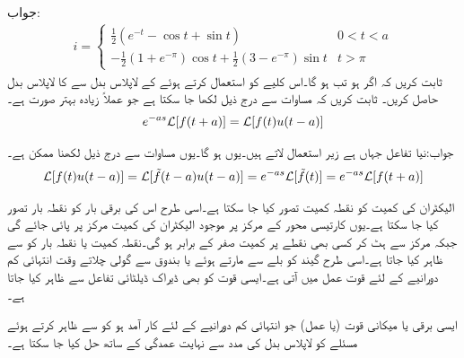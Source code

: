 جواب:
\begin{align*}
i=
\begin{cases}
\tfrac{1}{2}(e^{-t}-\cos t+\sin t) & 0<t<a\\
-\tfrac{1}{2}(1+e^{-\pi})\cos t+\tfrac{1}{2}(3-e^{-\pi})\sin t& t>\pi
\end{cases}
\end{align*}
ثابت کریں کہ اگر  ہو تب  ہو گا۔اس کلیے کو استعمال کرتے ہوئے  کے لاپلاس بدل سے  کا لاپلاس بدل حاصل کریں۔
ثابت کریں کہ مساوات  سے درج ذیل لکھا جا سکتا ہے جو عملاً زیادہ بہتر صورت ہے۔
\begin{align}
e^{-as}\mathcal{L}[f(t+a)]=\mathcal{L}[f(t)u(t-a)]
\end{align}

جواب:نیا تفاعل  جہاں  ہے زیر استعمال لاتے ہیں۔یوں  ہو گا۔یوں مساوات  سے درج ذیل لکھنا ممکن ہے۔
\begin{align*}
\mathcal{L}[f(t)u(t-a)]=\mathcal{L}[\tilde{f}(t-a)u(t-a)]=e^{-as}\mathcal{L}[\tilde{f}(t)]=e^{-as}\mathcal{L}[f(t+a)]
\end{align*}


الیکٹران کی کمیت کو نقطہ کمیت تصور کیا جا سکتا ہے۔اسی طرح اس کی برقی بار کو نقطہ بار تصور کیا جا سکتا ہے۔یوں کارتیسی محور کے مرکز پر موجود الیکٹران کی کمیت مرکز پر پائی جائے گی جبکہ مرکز سے ہٹ کر کسی بھی نقطے پر کمیت صفر کے برابر ہو گی۔نقطہ کمیت یا نقطہ بار کو  سے ظاہر کیا جاتا ہے۔اسی طرح گیند کو بلے سے مارتے ہوئے یا بندوق سے گولی چلاتے وقت  انتہائی کم دورانیے کے لئے قوت عمل میں آتی ہے۔ایسی قوت کو بھی ڈیراک ڈیلٹائی تفاعل سے ظاہر کیا جاتا ہے۔

ایسی برقی یا میکانی قوت (یا عمل) جو انتہائی کم دورانیے کے لئے کار آمد ہو کو  سے ظاہر کرتے ہوئے  مسئلے کو لاپلاس بدل کی مدد سے نہایت عمدگی کے ساتھ حل کیا جا سکتا ہے۔

